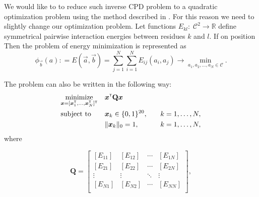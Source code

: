 \documentclass[12pt,twoside]{article}
\begin{document}
We would like to to reduce such inverse CPD problem to a quadratic optimization problem using the method described in \cite{Riazanov:2016}. For this reason we need to slightly change our optimization problem. Let functions $E_{kl}:\;\mathcal{C}^2\to\mathbb{R}$ define symmetrical pairwise interaction energies between residues $k$ and $l$. If on position Then the problem of energy minimization is represented as
\begin{equation}   
\label{2}
	\phi_{\vec{b}}(a): = E(\vec{a},\vec{b}) = \sum_{j=1}^N\sum_{i=1}^NE_{ij}(a_i,a_j) \rightarrow \underset{a_1,a_2,\dots,a_N \in \mathcal{C}}{\min}.
\end{equation}

The problem can also be written in the following way:
\begin{equation}
\label{3}
\begin{aligned}
	&\underset{\vec{x}=[\vec{x}_1\T,\dots,\vec{x}_N\T]\T}{\text{minimize}} &&\vec{x}\T\mathbf{Q}\vec{x} \\
	&\text{subject to} &&\vec{x}_k \in \{0,1\}^{20}, \quad &k=1,\dots, N,		\\
	&		         &&\|{\vec{x}_k}\|_0 =1,\quad &k=1,\dots,N,
\end{aligned}
\end{equation}
where



\[ \mathbf{Q} = 
\begin{bmatrix} [E_{11}] & [E_{12}]& \cdots & [E_{1N}] \\
		     [E_{21}] & [E_{22}]& \cdots & [E_{2N}] \\
		     \vdots	& \vdots	&	\ddots      &   \vdots \\
		     [E_{N1}] & [E_{N2}]& \cdots & [E_{NN}] \\
\end{bmatrix}, 						\]
\end{document}
